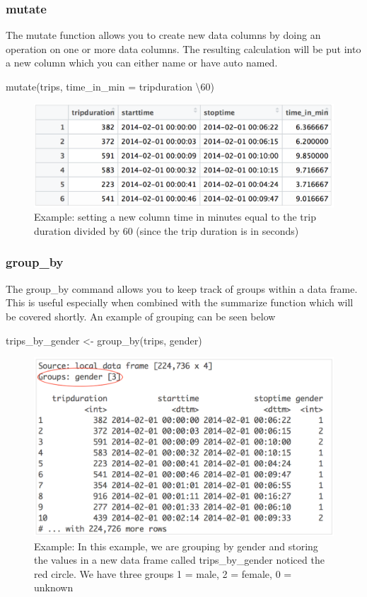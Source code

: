 \documentclass{article}
\begin{document}
\subsubsection{mutate}
\begin{flushleft}
The mutate function allows you to create new data columns by doing an operation on one or more data columns. The resulting calculation will be put into a new column which you can either name or have auto named. 
\end{flushleft}

\begin{center}
mutate(trips, time\_in\_min = tripduration \textbackslash 60)
\end{center}

\begin{figure}[H]
    \centering
    \includegraphics[width=.75\textwidth]{mutate_trips_ex.png}
    \caption{Example: setting a new column time in minutes equal to the trip duration divided by 60 (since the trip duration is in seconds)}
    \label{fig:mutate_trips_ex}
\end{figure}


\subsubsection{group\_by}
\begin{flushleft}
The group\_by command allows you to keep track of groups within a data frame. This is useful especially when combined with the summarize function which will be covered shortly. An example of grouping can be seen below
\end{flushleft}

\begin{center}
trips\_by\_gender <- group\_by(trips, gender)
\end{center}    

\begin{figure}[H]
    \centering
    \includegraphics[width=.75\textwidth]{group_by_gender.png}
    \caption{Example: In this example, we are grouping by gender and storing the values in a new data frame called trips\_by\_gender noticed the red circle. We have three groups 1 = male, 2 = female, 0 = unknown}
    \label{fig:group_by_gender}
\end{figure}
\end{document}
